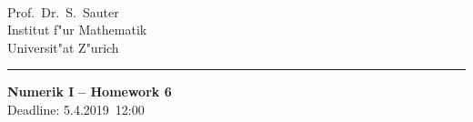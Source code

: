 \documentclass[11pt,a4paper,german]{scrartcl}
\def\blnr{6}              %
\def\sdate{5.4.2019}    %
\theoremstyle{break}   %
\begin{document}
\parbox{0ex}{    }   \\

\parbox{25ex}{
  Prof.~Dr.~S.~Sauter\\
  Institut f"ur Mathematik\\
  Universit"at Z"urich
  }
%
\rule[0cm]{0.cm}{.01cm}
\hfill  \parbox{0.6\textwidth}{
  {\sffamily\LARGE\bfseries Numerik I}
  {\sffamily\Large\bfseries \;\;--\;\; Homework \blnr }\\[1.5ex]
  Deadline: \sdate\ 12:00
  }
  
\end{document}
